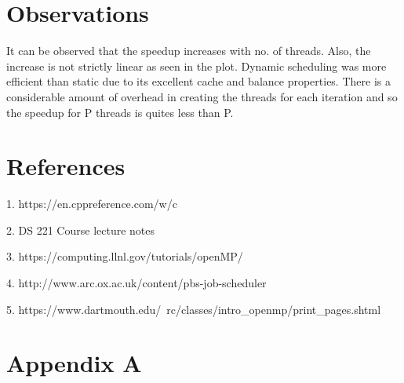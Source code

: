 \documentclass[11pt,a4paper,oneside]{article}
\begin{document}
     
    \section{Observations}
    It can be observed that the speedup increases with no. of threads. Also, the increase is not strictly linear as seen in the plot. Dynamic scheduling was more efficient than static due to its excellent cache and balance properties. There is a considerable amount of overhead in creating the threads for each iteration and so the speedup for P threads is quites less than P.
     
    
    \section{References}
    \begin{list}{}{}
    	\item 1. https://en.cppreference.com/w/c
    	\item 2. DS 221 Course lecture notes
    	\item 3. https://computing.llnl.gov/tutorials/openMP/
    	\item 4. http://www.arc.ox.ac.uk/content/pbs-job-scheduler
    	\item 5. https://www.dartmouth.edu/~rc/classes/intro\_openmp/print\_pages.shtml
    \end{list}

    \section{Appendix A} 
    
\end{document}
